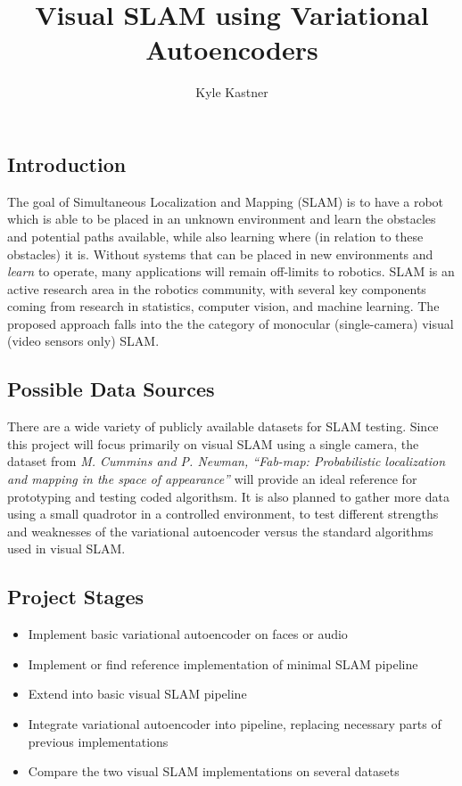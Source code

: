 \documentclass{article}
\begin{document}
\title{Visual SLAM using Variational Autoencoders}
\author{Kyle Kastner}

\maketitle

\subsection*{Introduction}
The goal of Simultaneous Localization and Mapping (SLAM) is to have a robot
which is able to be placed in an unknown environment and learn the obstacles
and potential paths available, while also learning where (in relation to these
obstacles) it is. Without systems that can be placed in new environments and
\emph{learn} to operate, many applications will remain off-limits to robotics.
SLAM is an active research area in the robotics community, with several key
components coming from research in statistics, computer vision, and
machine learning. The proposed approach falls into the the category of
monocular (single-camera) visual (video sensors only) SLAM. 

\subsection*{Possible Data Sources}
There are a wide variety of publicly available datasets for SLAM testing. Since
this project will focus primarily on visual SLAM using a single camera, the
dataset from \emph{M. Cummins and P. Newman, “Fab-map: Probabilistic localization
and mapping in the space of appearance”} will provide an ideal 
reference for prototyping and testing coded algorithsm. It is also planned to
gather more data using a small quadrotor in a controlled environment, to test
different strengths and weaknesses of the variational autoencoder versus the
standard algorithms used in visual SLAM.

\subsection*{Project Stages}
\begin{itemize}
    \item Implement basic variational autoencoder on faces or audio
    \item Implement or find reference implementation of minimal SLAM pipeline
    \item Extend into basic visual SLAM pipeline
    \item Integrate variational autoencoder into pipeline, replacing necessary
        parts of previous implementations
    \item Compare the two visual SLAM implementations on several datasets
\end{itemize}
\end{document}

